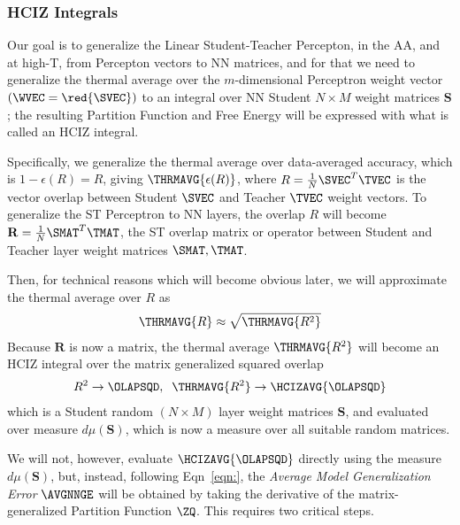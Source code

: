 
\subsubsection{HCIZ Integrals}

Our goal is to generalize the Linear Student-Teacher Percepton, in the AA, and at high-T,
from Percepton vectors to NN matrices, and for that we need to generalize the thermal average over the
$m$-dimensional Perceptron weight vector $(\WVEC=\red{\SVEC})$
to an integral over NN Student $N \times M$ weight matrices $\mathbf{S}$;
the resulting Partition Function and Free Energy will be expressed with what is called an HCIZ integral.

Specifically, we  generalize the thermal average over data-averaged accuracy, which is
$1-\epsilon(R)=R$, giving $\THRMAVG{\epsilon(R)}$, 
where $R=\tfrac{1}{N}\SVEC^{T}\TVEC$  is the vector overlap between
Student $\SVEC$ and Teacher $\TVEC$ weight vectors.
To generalize the ST Perceptron to NN layers, the overlap $R$ will become
 $\mathbf{R}=\tfrac{1}{N}\SMAT^{T}{\TMAT}$, the ST overlap matrix or operator
between Student and Teacher layer weight matrices $\SMAT, \TMAT$.

Then, for technical reasons which will become obvious later,
we will approximate the thermal average over $R$ as
\begin{align}
  \THRMAVG{R}\approx\sqrt{\THRMAVG{R^{2}}}
\end{align}
Because $\mathbf{R}$ is now a matrix, the thermal average 
$\THRMAVG{R^{2}}$  will become an  HCIZ integral 
over the matrix generalized squared overlap 
\begin{align}
R^{2}\rightarrow \OLAPSQD,\;\;  \THRMAVG{R^{2}}\rightarrow\HCIZAVG{\OLAPSQD}
\end{align}
which is a Student random $(N \times M)$ layer weight matrices $\mathbf{S}$,
and evaluated over measure $d\mu(\mathbf{S})$, which is now a measure over
all suitable random matrices.

We will not, however, evaluate $\HCIZAVG{\OLAPSQD}$ directly using the measure
$d\mu(\mathbf{S})$, but, instead,
following Eqn~\ref{eqn:}, the \emph{Average Model Generalization Error} $\AVGNNGE$
will be obtained by taking the derivative of the matrix-generalized
Partition Function $\ZQ$.  This requires two critical steps.

